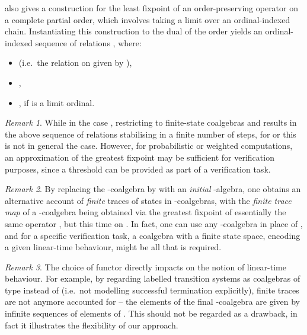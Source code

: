 \documentclass[submission,copyright,creativecommons]{eptcs}
\theoremstyle{plain}\newtheorem{theorem}{Theorem}[section]
\theoremstyle{remark}
\newtheorem{remark}{Remark}[section]
\begin{document}
\cite{Priestley2002} also gives a construction for the least fixpoint of an order-preserving operator on a complete partial order, which involves taking a limit over an ordinal-indexed chain. Instantiating this construction to the dual of the order  yields an ordinal-indexed sequence of relations , where:
\begin{itemize}
\item  (i.e.~the relation on  given by ),
\item ,
\item , if  is a limit ordinal.
\end{itemize}
\begin{remark}
While in the case , restricting to finite-state coalgebras  and  results in the above sequence of relations stabilising in a finite number of steps, for  or  this is not in general the case. However, for probabilistic or weighted computations, an approximation of the greatest fixpoint may be sufficient for verification purposes, since a threshold can be provided as part of a verification task.
\end{remark}

\begin{remark}
By replacing the -coalgebra  by  with  an \emph{initial} -algebra, one obtains an alternative account of \emph{finite} traces of states in -coalgebras, with the \emph{finite trace map}  of a -coalgebra  being obtained via the greatest fixpoint of essentially the same operator , but this time on . In fact, one can use any -coalgebra in place of , and for a specific verification task, a coalgebra with a finite state space, encoding a given linear-time behaviour, might be all that is required. 
\end{remark}

\begin{remark}
The choice of functor  directly impacts on the notion of linear-time behaviour. For example, by regarding labelled transition systems as coalgebras of type  instead of  (i.e.~not modelling successful termination explicitly), finite traces are not anymore accounted for -- the elements of the final -coalgebra are given by infinite sequences of elements of . This should not be regarded as a drawback, in fact it illustrates the flexibility of our approach.
\end{remark}
\end{document}

